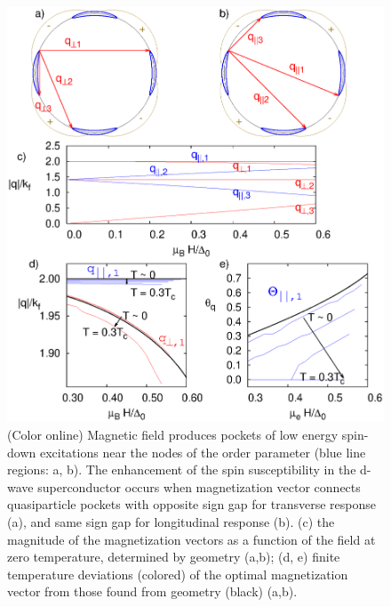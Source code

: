 \documentclass[aps,prl,twocolumn,showpacs,amsmath,amssymb]{revtex4-1}
\begin{document}
%
\begin{figure}[t]
\includegraphics[width=0.95\linewidth]{Fig2.eps}
\caption{ 
	\label{fig:qq} 
	(Color online) 
	Magnetic field produces pockets of low energy spin-down excitations near the nodes 
	of the order parameter (blue line regions: a, b). 
	The enhancement of the spin susceptibility in the d-wave superconductor occurs 
	when magnetization vector connects quasiparticle pockets with opposite sign gap 
	for transverse response (a), and same sign gap for longitudinal response (b). 
	(c) the magnitude of the magnetization vectors as a function of the field at zero 
	temperature, determined by geometry (a,b); 
	(d, e) finite temperature deviations (colored) of the optimal magnetization vector from those found from geometry (black) (a,b). 
} 
\end{figure}
\end{document}
